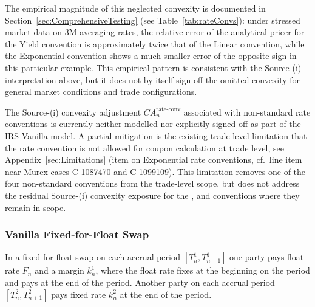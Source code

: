 \documentclass[]{pmv_report} %
\begin{document}
{\begin{minipage}{0.97\linewidth}
The empirical magnitude of this neglected convexity is documented in Section~\ref{sec:ComprehensiveTesting} (see Table~\ref{tab:rateConvs}): under stressed market data on $3$M averaging rates, the relative error of the analytical pricer for the Yield convention is approximately twice that of the Linear convention, while the Exponential convention shows a much smaller error of the opposite sign in this particular example.
This empirical pattern is consistent with the Source-(i) interpretation above, but it does not by itself sign-off the omitted convexity for general market conditions and trade configurations.

The Source-(i) convexity adjustment $CA_n^{\text{rate-conv}}$ associated with non-standard rate conventions is currently neither modelled nor explicitly signed off as part of the IRS Vanilla model.
A partial mitigation is the existing trade-level limitation that the  rate convention is not allowed for coupon calculation at trade level, see Appendix~\ref{sec:Limitations} (item on Exponential rate conventions, cf.\ line item near Murex cases C-1087470 and C-1099109).
This limitation removes one of the four non-standard conventions from the trade-level scope, but does not address the residual Source-(i) convexity exposure for the ,  and  conventions where they remain in scope.
\end{minipage}}
\bigskip

\subsubsection{Vanilla Fixed-for-Float Swap}
In a fixed-for-float swap on each accrual period $[T_n^1,T_{n+1}^1]$ one party pays float \Libor rate $F_n$ and a margin $k_n^1$, where the float rate fixes at the beginning on the period and pays at the end of the period.
Another party on each accrual period $[T_n^2,T_{n+1}^2]$ pays fixed rate $k_n^2$ at the end of the period.
\end{document}
